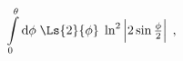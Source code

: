 \begin{equation}
\label{nontrivial5}
\int\limits_0^\theta {\mbox d} \phi \; 
\Ls{2}{\phi} \; \ln^2 \left| 2\sin\tfrac{\phi}{2} \right| \; ,
\end{equation}

